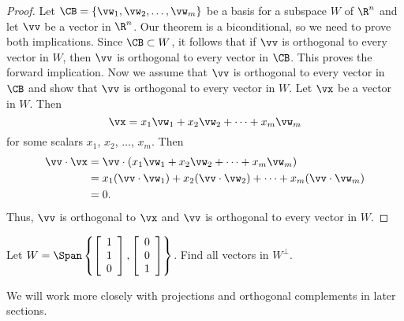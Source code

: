\begin{proof} Let $\CB = \{\vw_1, \vw_2, \ldots, \vw_m\}$ be a basis for a subspace $W$ of $\R^n$ and let $\vv$ be a vector in $\R^n$. Our theorem is a biconditional, so we need to prove both implications. Since $\CB \subset W$, it follows that if $\vv$ is orthogonal to every vector in $W$, then $\vv$ is orthogonal to every vector in $\CB$. This proves the forward implication. Now we assume that $\vv$ is orthogonal to every vector in $\CB$ and show that $\vv$ is orthogonal to every vector in $W$. Let $\vx$ be a vector in $W$. Then
\[\vx = x_1\vw_1 + x_2\vw_2 + \cdots + x_m\vw_m\]
for some scalars $x_1$, $x_2$, $\ldots$, $x_m$. Then
\begin{align*}
\vv \cdot \vx &= \vv \cdot (x_1\vw_1 + x_2\vw_2 + \cdots + x_m\vw_m) \\
	&= x_1(\vv \cdot \vw_1) + x_2(\vv \cdot \vw_2) + \cdots + x_m(\vv \cdot \vw_m) \\
	&= 0.
\end{align*}
Thus, $\vv$ is orthogonal to $\vx$ and $\vv$ is orthogonal to every vector in $W$.
\end{proof}

\begin{activity} Let $W = \Span\left\{ \left[ \begin{array}{c} 1 \\ 1 \\ 0 \end{array} \right], \left[ \begin{array}{c} 0 \\ 0 \\ 1 \end{array} \right] \right\}$. Find all vectors in $W^{\perp}$.

\end{activity}

We will work more closely with projections and orthogonal complements in later sections.

\label{sec:dot_prod_exam}

\ExampleIntro

